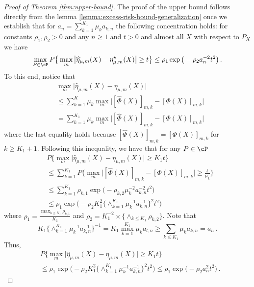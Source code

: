 

\begin{proof}[Proof of Theorem \ref{thm:upper-bound}]

    The proof of the upper bound follows directly from the lemma \ref{lemma:excess-risk-bound-generalization} once we establish that for $a_n = \sum_{k = 1}^{K_1}\mu_k a_{k, n}$ the following concentration holds: 
    for constants $\rho_{ 1}, \rho_{ 2} > 0$ and any $n \ge 1$ and $t > 0$ and almost all $X$ with respect to $P_X$ we have 
    \begin{equation} \label{eq:concentration-phi-gen}
        \max_{P\in \cP} P \big \{ \max_m \big |\widehat \eta_{\mu, m} (X) - \eta^\star_{\mu, m}  (X)\big |  \ge t\big \} \le  \rho_1 \exp\big (- \rho_2 a_{ n}^{-2} t^2 \big )\,.   
    \end{equation} To this end, notice that 
    \[
    \begin{aligned}
        & \textstyle\max_m \big |\widehat \eta_{\mu, m} (X) - \eta_{\mu, m}  (X)\big | \\
        & \textstyle \le \sum_{k = 1}^{K} \mu_k  \max_m\big |[\hat \Phi(X)]_{m, k} - [ \Phi(X)]_{m, k} \big| \\
        & = \textstyle \sum_{k = 1}^{K_1} \mu_k  \max_m\big |[\hat \Phi(X)]_{m, k} - [ \Phi(X)]_{m, k} \big|
    \end{aligned}
    \] where the last equality holds because $[\hat \Phi(X)]_{m, k} = [\Phi(X)]_{m, k}$ for $k \ge K_1+1$. Following this inequality, we have that for any $P\in \cP$ \[
    \begin{aligned}
        & \textstyle P \big \{ \max_m \big |\widehat \eta_{\mu, m} (X) - \eta_{\mu, m}  (X)\big |  \ge K_1 t\big \}\\
        & \le \textstyle \sum_{k = 1}^{K_1} P \big \{ \max_m \big |[\hat \Phi(X)]_{m, k} - [ \Phi(X)]_{m, k} \big|  \ge \frac t{\mu_k}\big \} \\
        & \le \textstyle \sum_{k = 1}^{K_1}\rho_{k, 1} \exp\big (- \rho_{k, 2} \mu_k ^{-2}a_{ k, n}^{-2} t^2 \big )\\
        & \textstyle \le  \rho_1 \exp\big (- {\rho_{ 2}}{K_1^2} \{\wedge_{k = 1}^{K_1}\mu_k^{-1}a_{ k, n}^{-1}\}^2 t^2 \big )
    \end{aligned}
    \] where $\rho_1 = \frac{\max_{k \le K_1} \rho_{k, 1}}{K_1}$ and $\rho_2 = K_1^{-2} \times \{ \wedge_{k \le K_1} \rho_{k, 2}\} $. Note that 
    \[
    \textstyle K_1\{\wedge_{k = 1}^{K_1}\mu_k^{-1}a_{ k, n}^{-1}\}^{-1} = K_1 \max_{k = 1}^{K_1}\mu_k a_{ l, n} \ge  \sum_{k \le K_1 } \mu_k a_{ k, n} = a_n\,. 
    \] Thus, 
    \[
    \begin{aligned}
       & \textstyle P \big \{ \max_m \big |\widehat \eta_{\mu, m} (X) - \eta_{\mu, m}  (X)\big |  \ge K_1 t\big \}\\
        & \textstyle \le  \rho_1 \exp\big (- {\rho_{ 2}}{K_1^2} \{\wedge_{k = 1}^{K_1}\mu_k^{-1}a_{ k, n}^{-1}\}^2 t^2 \big ) \le \rho_1 \exp\big (- {\rho_{ 2}}a_n ^2 t^2 \big ) \,.
    \end{aligned}
    \] 

    
\end{proof}

